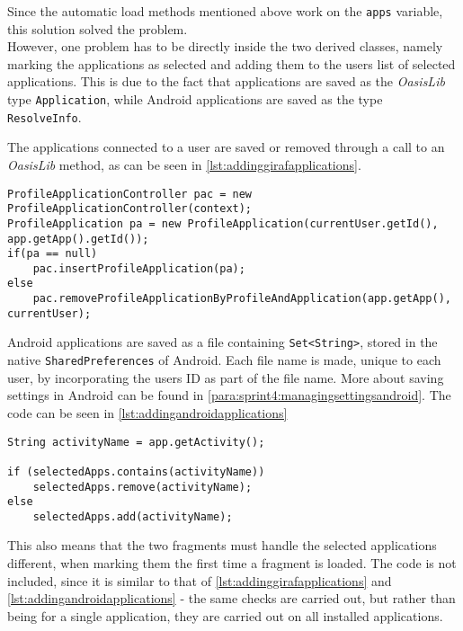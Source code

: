 Since the automatic load methods mentioned above work on the \lstinline!apps! variable, this solution solved the problem. \\

However, one problem has to be directly inside the two derived classes, namely marking the applications as selected and adding them to the users list of selected applications.
This is due to the fact that \giraf applications are saved as the \textit{OasisLib} type \lstinline!Application!, while Android applications are saved as the type \lstinline!ResolveInfo!.

The \giraf applications connected to a user are saved or removed through a call to an \textit{OasisLib} method, as can be seen in \cref{lst:addinggirafapplications}.

\begin{lstlisting}[caption={The methods used for adding or removing a Giraf application to a user}, label={lst:addinggirafapplications}]
ProfileApplicationController pac = new ProfileApplicationController(context);
ProfileApplication pa = new ProfileApplication(currentUser.getId(), app.getApp().getId());
if(pa == null)
	pac.insertProfileApplication(pa);
else
	pac.removeProfileApplicationByProfileAndApplication(app.getApp(), currentUser);
\end{lstlisting}

Android applications are saved as a file containing \lstinline!Set<String>!, stored in the native \lstinline!SharedPreferences! of Android.
Each file name is made, unique to each user, by incorporating the users ID as part of the file name.
More about saving settings in Android can be found in \cref{para:sprint4:managingsettingsandroid}.
The code can be seen in \cref{lst:addingandroidapplications}\\

\begin{lstlisting}[caption={The methods used for adding or removing a GIRAF application to a user. Please note that the documentation has been removed.}, label={lst:addingandroidapplications}]
String activityName = app.getActivity();

if (selectedApps.contains(activityName))
    selectedApps.remove(activityName);
else
    selectedApps.add(activityName);
\end{lstlisting}

This also means that the two fragments must handle the selected applications different, when marking them the first time a fragment is loaded.
The code is not included, since it is similar to that of \cref{lst:addinggirafapplications} and \cref{lst:addingandroidapplications} - the same checks are carried out, but rather than being for a single application, they are carried out on all installed applications.